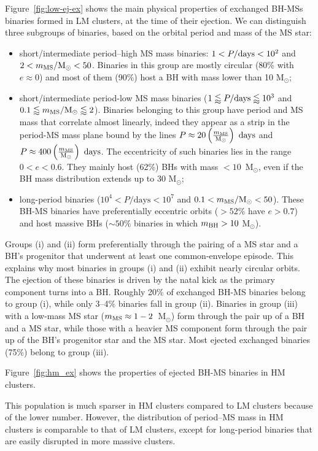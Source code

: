 \documentclass[fleqn,usenatbib]{mnras}
\newcommand{\Ms}{M$_\odot$}
\begin{document}
Figure~\ref{fig:low-ej-ex} 
shows the main physical properties of  exchanged BH-MSs binaries formed in LM clusters, at the time of their ejection.  
We can distinguish three subgroups of binaries, based on the orbital period and mass of the MS star:
\begin{itemize}
    \item[i)] short/intermediate period--high MS mass binaries: $1<P/\rm{days}<10^{2}$ and $2<m_{\rm{MS}}/\rm{M}_{\odot}<50$. Binaries in this group are mostly circular (80\% with $e\approx0$) and most of them (90\%) host a BH with mass lower than 10 \Ms; 
    \item[ii)] short/intermediate period-low MS mass binaries ($1 \lessapprox P/\rm{days} \lessapprox 10^{3}$ and $0.1 \lessapprox m_{\rm{MS}}/\rm{M}_{\odot} \lessapprox 2$). Binaries belonging to this group have period and MS mass that correlate almost linearly, indeed they appear as a strip in the period-MS mass plane bound by the lines $P\approx20 \left(\frac{m_{\rm{MS}}}{\rm{M}_{\odot}}\right) \ \rm{days}$ and $P\approx 400 \left(\frac{m_{\rm{MS}}}{\rm{M}_{\odot}}\right) \ \rm{days}$. The eccentricity of such binaries lies in the range $0<e<0.6$. They mainly host (62\%) BHs with mass $<10$~\Ms, even if the BH mass distribution extends up to 30 \Ms;
    \item[iii)] long-period binaries ($10^{4}<P/\mathrm{days}< 10^{7}$ and $0.1 < m_{\rm{MS}}/\rm{M}_{\odot}<50$). These BH-MS binaries have preferentially eccentric orbits ($>52$\% have $e>0.7$) and host massive BHs ($\sim50$\% binaries in which $m_{\rm{BH}}>10$ \Ms). 
\end{itemize}
Groups (i) and (ii) form preferentially through the pairing of a MS star and a BH's progenitor that underwent at least one common-envelope episode. This explains why most binaries in groups (i) and (ii) exhibit nearly circular orbits. The ejection of these binaries is driven by the natal kick as the primary component turns into a BH. Roughly 20\% of exchanged BH-MS binaries belong to group (i), while only 3--4\% binaries fall in group (ii). Binaries in group (iii) with a low-mass MS star ($m_{\rm{MS}} \approx 1-2$~\Ms) form through the pair up of a BH and a MS star, while those with a heavier MS component form through the pair up of the BH's progenitor star and the MS star. Most ejected exchanged binaries (75\%) belong to group (iii). 


Figure~\ref{fig:hm_ex} shows the properties of ejected BH-MS binaries in HM clusters. 

This population is much sparser in HM clusters compared to LM clusters because of the lower number. However, the distribution of period--MS mass in HM clusters is comparable to that of LM clusters, except for long-period binaries that are easily disrupted in more massive clusters. 
\end{document}
